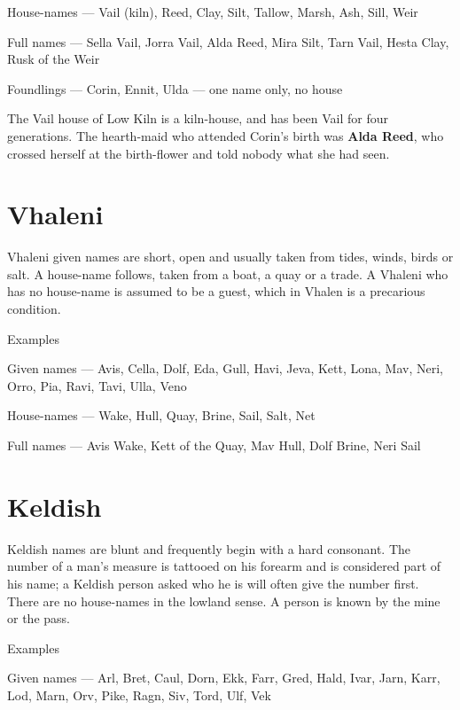 \documentclass{design/chronicle}
\begin{document}
House-names — Vail (kiln), Reed, Clay, Silt, Tallow, Marsh, Ash, Sill, Weir\par

Full names — Sella Vail, Jorra Vail, Alda Reed, Mira Silt, Tarn Vail, Hesta Clay, Rusk of the Weir\par

Foundlings — Corin, Ennit, Ulda — one name only, no house\par

The Vail house of Low Kiln is a kiln-house, and has been Vail for four generations. The hearth-maid who attended Corin’s birth was \textbf{Alda Reed}, who crossed herself at the birth-flower and told nobody what she had seen.

\section*{Vhaleni}

Vhaleni given names are short, open and usually taken from tides, winds, birds or salt. A house-name follows, taken from a boat, a quay or a trade. A Vhaleni who has no house-name is assumed to be a guest, which in Vhalen is a precarious condition.

Examples\par

Given names — Avis, Cella, Dolf, Eda, Gull, Havi, Jeva, Kett, Lona, Mav, Neri, Orro, Pia, Ravi, Tavi, Ulla, Veno\par

House-names — Wake, Hull, Quay, Brine, Sail, Salt, Net\par

Full names — Avis Wake, Kett of the Quay, Mav Hull, Dolf Brine, Neri Sail\par

\section*{Keldish}

Keldish names are blunt and frequently begin with a hard consonant. The number of a man’s measure is tattooed on his forearm and is considered part of his name; a Keldish person asked who he is will often give the number first. There are no house-names in the lowland sense. A person is known by the mine or the pass.

Examples\par

Given names — Arl, Bret, Caul, Dorn, Ekk, Farr, Gred, Hald, Ivar, Jarn, Karr, Lod, Marn, Orv, Pike, Ragn, Siv, Tord, Ulf, Vek\par
\end{document}
